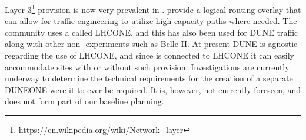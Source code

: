 \documentclass[../main-v1.tex]{subfiles}
\begin{document}
 Layer-3\footnote{https://en.wikipedia.org/wiki/Network\_layer}  provision is now very prevalent in . 
  provide a logical routing overlay that can allow for traffic engineering to utilize high-capacity paths where needed. The  community uses a  called LHCONE, and this has also been used for DUNE traffic along with other non- experiments such as Belle II. 
At present DUNE is agnostic %
regarding the use of LHCONE, and since  is connected to LHCONE it can easily accommodate sites with or without such provision.
Investigations are currently underway to determine the technical requirements for the creation of a separate DUNEONE  were it to ever be required. It is, however, not currently foreseen, and does not form part of our baseline planning.
\end{document}
